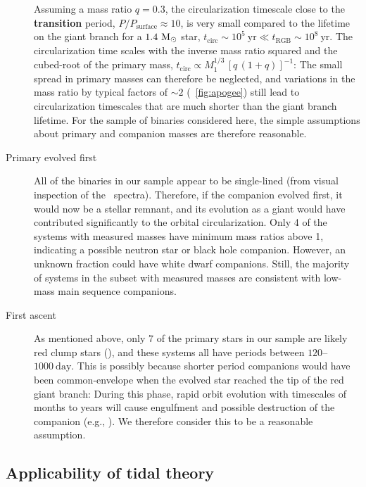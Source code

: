 \documentclass[modern, letterpaper]{aastex62}
\newcommand{\apogee}{\project{\acronym{APOGEE}}}
\newcommand{\Psurf}{\ensuremath{P_\textrm{surface}}}
\renewcommand{\changes}[1]{\textbf{#1}}
\begin{document}
\begin{description}
    Assuming a mass ratio $q = 0.3$, the circularization timescale close to the
    \changes{transition} period, $P / \Psurf \approx 10$, is very small compared
    to the lifetime on the giant branch for a $1.4~\mathrm{M}_\odot$ star, $t_\textrm{circ}
    \sim 10^5~\textrm{yr} \ll t_\textrm{RGB} \sim 10^8~\textrm{yr}$.
    The circularization time scales with the inverse mass ratio squared and the
    cubed-root of the primary mass, $t_\textrm{circ} \propto M_1^{1/3} \, \left[
    q \, (1 + q) \right]^{-1}$:
    The small spread in primary masses can therefore be neglected, and
    variations in the mass ratio by typical factors of $\sim 2$
    (\figurename~\ref{fig:apogee}) still lead to circularization timescales that
    are much shorter than the giant branch lifetime.
    For the sample of binaries considered here, the simple assumptions about
    primary and companion masses are therefore reasonable.
    \item[Primary evolved first] All of the binaries in our sample appear to be
    single-lined (from visual inspection of the \apogee\ spectra).
    Therefore, if the companion evolved first, it would now be a stellar
    remnant, and its evolution as a giant would have contributed significantly
    to the orbital circularization.
    Only 4 of the systems with measured masses have minimum mass ratios above 1,
    indicating a possible neutron star or black hole companion.
    However, an unknown fraction could have white dwarf companions.
    Still, the majority of systems in the subset with measured masses are
    consistent with low-mass main sequence companions.
    \item[First ascent] As mentioned above, only 7 of the primary stars in our
    sample are likely red clump stars (\citealt{Ting:2018}), and these systems
    all have periods between $120$--$1000~\textrm{day}$.
    This is possibly because shorter period companions would have been
    common-envelope when the evolved star reached the tip of the red giant
    branch: During this phase, rapid orbit evolution with timescales of months
    to years will cause engulfment and possible destruction of the companion
    (e.g., \citealt{Nordhaus:2010}).
    We therefore consider this to be a reasonable assumption.
\end{description}

\subsection{Applicability of tidal theory}
\end{document}
